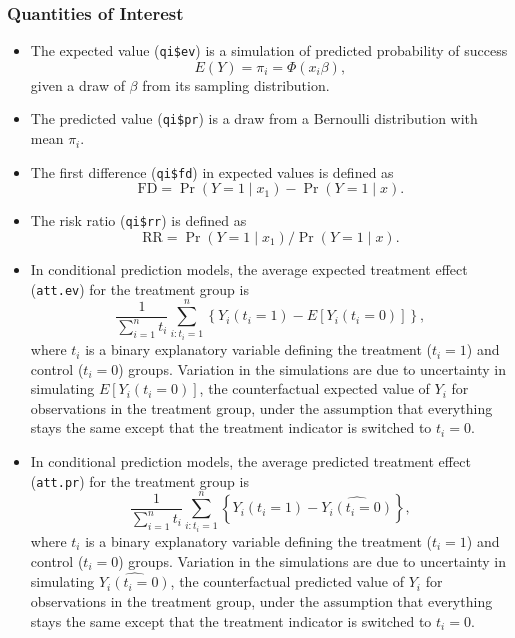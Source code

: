 \documentclass{article}
\begin{document}
\subsubsection{Quantities of Interest}

\begin{itemize}

\item The expected value ({\tt qi\$ev}) is a simulation of predicted
  probability of success $$E(Y) = \pi_i = \Phi(x_i
  \beta),$$ given a draw of $\beta$ from its sampling distribution.  

\item The predicted value ({\tt qi\$pr}) is a draw from a Bernoulli
  distribution with mean $\pi_i$.  
  
\item The first difference ({\tt qi\$fd}) in expected values is
  defined as
\begin{equation*}
\textrm{FD} = \Pr(Y = 1 \mid x_1) - \Pr(Y = 1 \mid x).
\end{equation*}

\item The risk ratio ({\tt qi\$rr}) is defined as
\begin{equation*}
\textrm{RR} = \Pr(Y = 1 \mid x_1) / \Pr(Y = 1 \mid x).
\end{equation*}

\item In conditional prediction models, the average expected treatment
  effect ({\tt att.ev}) for the treatment group is 
    \begin{equation*} \frac{1}{\sum_{i=1}^n t_i}\sum_{i:t_i=1}^n \left\{ Y_i(t_i=1) -
      E[Y_i(t_i=0)] \right\},
    \end{equation*} 
    where $t_i$ is a binary explanatory variable defining the treatment
    ($t_i=1$) and control ($t_i=0$) groups.  Variation in the
    simulations are due to uncertainty in simulating $E[Y_i(t_i=0)]$,
    the counterfactual expected value of $Y_i$ for observations in the
    treatment group, under the assumption that everything stays the
    same except that the treatment indicator is switched to $t_i=0$.

\item In conditional prediction models, the average predicted treatment
  effect ({\tt att.pr}) for the treatment group is 
    \begin{equation*} \frac{1}{\sum_{i=1}^n t_i}\sum_{i:t_i=1}^n \left\{ Y_i(t_i=1) -
      \widehat{Y_i(t_i=0)} \right\},
    \end{equation*} 
    where $t_i$ is a binary explanatory variable defining the
    treatment ($t_i=1$) and control ($t_i=0$) groups.  Variation in
    the simulations are due to uncertainty in simulating
    $\widehat{Y_i(t_i=0)}$, the counterfactual predicted value of
    $Y_i$ for observations in the treatment group, under the
    assumption that everything stays the same except that the
    treatment indicator is switched to $t_i=0$.
\end{itemize}
\end{document}
